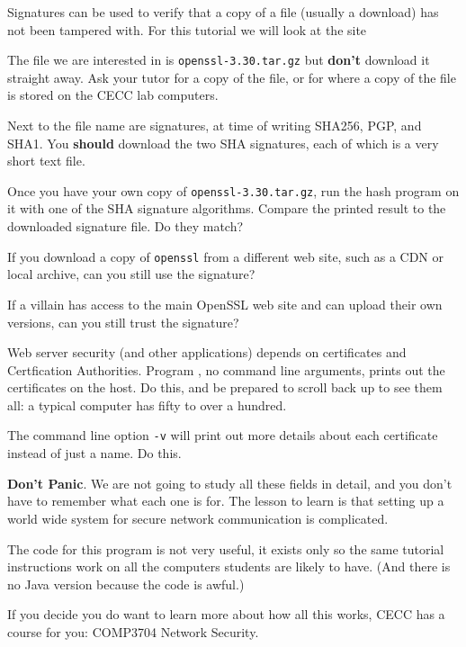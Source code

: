 \STEP Signatures can be used to verify that a copy of a file (usually a download)
has not been tampered with. For this tutorial we will look at the site

The file we are interested in is \texttt{openssl-3.30.tar.gz} but \textbf{don't}
download it straight away. Ask your tutor for a copy of the file, or for where
a copy of the file is stored on the CECC lab computers.

Next to the file name are signatures, at time of writing SHA256, PGP, and SHA1.
You \textbf{should} download the two SHA signatures, each of which is a very
short text file.

Once you have your own copy of \texttt{openssl-3.30.tar.gz}, run the hash
program on it with one of the SHA signature algorithms. Compare the printed
result to the downloaded signature file. Do they match?

If you download a copy of \texttt{openssl} from a different web site, such
as a CDN or local archive, can you still use the signature?

If a villain has access to the main OpenSSL web site and can upload their
own versions, can you still trust the signature?



\STEP Web server security (and other applications) depends on certificates
and Certfication Authorities. Program ,
no command line arguments, prints out the certificates on the host.
Do this, and be prepared to scroll back up to see them all: a typical computer
has fifty to over a hundred.

\STEP The command line option \texttt{-v} will print out more details about
each certificate instead of just a name. Do this.

\textbf{Don't Panic}. We are not going to study all these fields in detail,
and you don't have to remember what each one is for. The lesson to learn
is that setting up a world wide system for secure network communication is
complicated.

The code for this program is not very useful, it exists only so the same
tutorial instructions work on all the computers students are likely to have.
(And there is no Java version because the code is awful.)

If you decide you do want to learn more about how all this works, CECC
has a course for you: COMP3704 Network Security.



